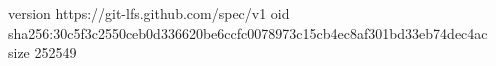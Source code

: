 version https://git-lfs.github.com/spec/v1
oid sha256:30c5f3c2550ceb0d336620be6ccfc0078973c15cb4ec8af301bd33eb74dec4ac
size 252549
